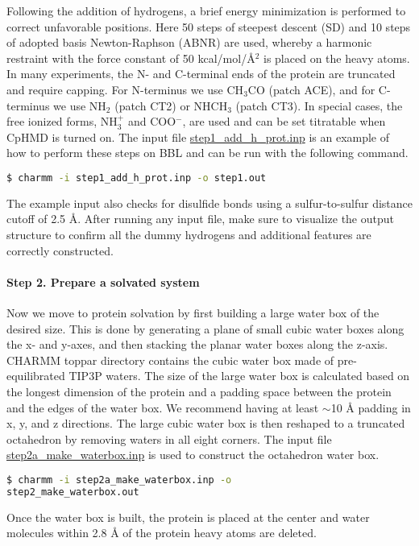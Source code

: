 Following the addition of hydrogens, a brief energy minimization is performed to correct unfavorable positions.
Here 50 steps of steepest descent (SD) and 10 steps of adopted basis Newton-Raphson (ABNR) are used, whereby a harmonic restraint with the force constant of 50 kcal/mol/{\AA}$^2$ is placed on the heavy atoms.
In many experiments, the N- and C-terminal ends of the protein are truncated and require capping. 
For N-terminus we use CH$_3$CO (patch ACE),
and for C-terminus we use NH$_2$ (patch CT2) or NHCH$_3$ (patch CT3).
In special cases, the free ionized forms, NH$_{3}^{+}$ and COO$^-$, 
are used and can be set titratable when CpHMD is turned on. 
The input file 
\href{https://gitlab.com/shenlab-amber-cphmd/cphmd-tutorial/-/tree/main/hphmd_charmm/bbl_sys_prep}
{step1\_add\_h\_prot.inp} is an example of 
how to perform these steps on BBL and can be run with the following command.
%
\begin{lstlisting}[language=bash]
$ charmm -i step1_add_h_prot.inp -o step1.out
\end{lstlisting}
%
The example input also checks for disulfide bonds using a sulfur-to-sulfur distance cutoff of 2.5 {\AA}. 
After running any input file, make sure to visualize the output 
structure to confirm all the dummy hydrogens and additional features are correctly constructed. 

\paragraph{Step 2. Prepare a solvated system}
Now we move to protein solvation by first building a large 
water box of the desired size.
This is done by generating a plane of small cubic water boxes 
along the x- and y-axes, and then stacking the planar water boxes along the z-axis.
CHARMM toppar directory contains the cubic water box made
of pre-equilibrated TIP3P waters.
The size of the large water box is calculated based on the longest
dimension of the protein and a padding space between the protein 
and the edges of the water box.
We recommend having at least $\sim$10 {\AA} padding in x, y, and z directions.
The large cubic water box is then reshaped to a truncated octahedron by removing waters in all eight corners. 
The input file
\href{https://gitlab.com/shenlab-amber-cphmd/cphmd-tutorial/-/tree/main/hphmd_charmm/bbl_sys_prep}
{step2a\_make\_waterbox.inp}
is used to construct the octahedron water box.
%
\begin{lstlisting}[language=bash]
$ charmm -i step2a_make_waterbox.inp -o 
step2_make_waterbox.out
\end{lstlisting}
%
Once the water box is built, the protein is placed at the center and water molecules within 2.8 {\AA} of the protein heavy atoms are deleted.

